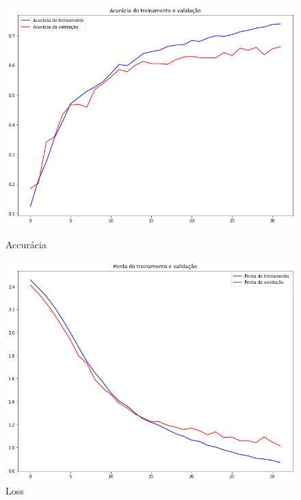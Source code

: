 \documentclass[12pt]{article}
\begin{document}
\begin{figure}[!htb]
  \begin{minipage}{.47\textwidth}
    \centering
    \includegraphics[width=1.1\linewidth]{experiments/lenet5_noaug_32/accuracy.png}
    \caption{Accurácia}\label{fig:experiment_lenet5_noaug_32_accuracy}
  \end{minipage}\hfill
  \begin{minipage}{.47\textwidth}
    \centering
    \includegraphics[width=1.1\linewidth]{experiments/lenet5_noaug_32/loss.png}
    \caption{Loss}\label{fig:experiment_lenet5_noaug_32_loss}
  \end{minipage}
\end{figure}
\end{document}
